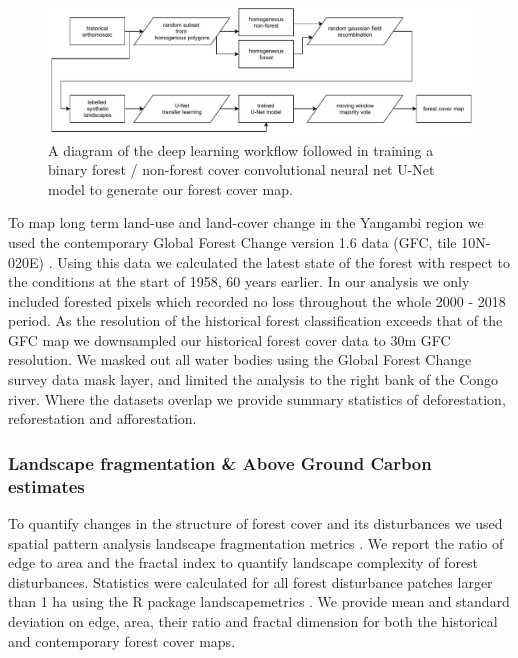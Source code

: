 \documentclass[remote sensing,article,submit,moreauthors,pdftex,10pt,a4paper]{mdpi}
\begin{document}
\begin{figure}
\includegraphics[width=1\linewidth]{./figures/cnn_diagram} \caption{A diagram of the deep learning workflow followed in training a binary forest / non-forest cover convolutional neural net U-Net model to generate our forest cover map.}\label{fig:unnamed-chunk-4}
\end{figure}

To map long term land-use and land-cover change in the Yangambi region
we used the contemporary Global Forest Change version 1.6 data (GFC,
tile 10N-020E) \citep{hansen2013}. Using this data we calculated the
latest state of the forest with respect to the conditions at the start
of 1958, 60 years earlier. In our analysis we only included forested
pixels which recorded no loss throughout the whole 2000 - 2018 period.
As the resolution of the historical forest classification exceeds that
of the GFC map we downsampled our historical forest cover data to 30m
GFC resolution. We masked out all water bodies using the Global Forest
Change survey data mask layer, and limited the analysis to the right
bank of the Congo river. Where the datasets overlap we provide summary
statistics of deforestation, reforestation and afforestation.

\hypertarget{landscape-fragmentation-above-ground-carbon-estimates}{%
\subsubsection{Landscape fragmentation \& Above Ground Carbon
estimates}\label{landscape-fragmentation-above-ground-carbon-estimates}}

To quantify changes in the structure of forest cover and its
disturbances we used spatial pattern analysis landscape fragmentation
metrics \citep{dale1999}. We report the ratio of edge to area and the
fractal index to quantify landscape complexity of forest disturbances.
Statistics were calculated for all forest disturbance patches larger
than 1 ha using the R package landscapemetrics \citep{hesselbarth2019}.
We provide mean and standard deviation on edge, area, their ratio and
fractal dimension for both the historical and contemporary
\citet{hansen2013} forest cover maps.
\end{document}
